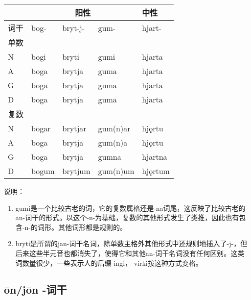 \begin{longtable}{lllll}
  \toprule
       & \multicolumn{3}{c}{\textbf{阳性}} & \textbf{中性}                      \\
  \midrule
  \endhead
  \bottomrule
  \endfoot
  词干 & bog-                              & bryt-j-       & gum-     & hjart-  \\
  单数 &                                   &               &          &         \\
  N    & bogi                              & bryti         & gumi     & hjarta  \\
  A    & boga                              & brytja        & guma     & hjarta  \\
  G    & boga                              & brytja        & guma     & hjarta  \\
  D    & boga                              & brytja        & guma     & hjarta  \\
  复数 &                                   &               &          &         \\
  N    & bogar                             & brytjar       & gum(n)ar & hjǫrtu  \\
  A    & boga                              & brytja        & gum(n)a  & hjǫrtu  \\
  G    & boga                              & brytja        & gumna    & hjartna \\
  D    & bogum                             & brytjum       & gum(n)um & hjǫrtum \\
\end{longtable}

说明：

\begin{enumerate}
  \item
        gumi是一个比较古老的词，它的复数属格还是-na词尾，这反映了比较古老的an-词干的形式。以这个-n-为基础，复数的其他形式发生了类推，因此也有包含-n-的词形。其他词形都是规则的。
  \item
        bryti是所谓的jan-词干名词，除单数主格外其他形式中还规则地插入了-j-，但后来这些半元音也都消失了，使得它和其他an-词干名词没有任何区别。这类词数量很少，一些表示人的后缀-ingi，-virki按这种方式变格。
\end{enumerate}

\subsection{ōn/jōn -词干}
\label{ōn/jōn -词干}

